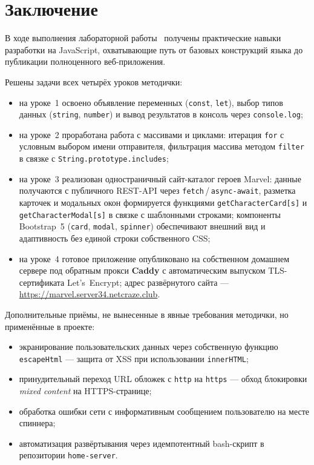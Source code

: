\chapter*{Заключение}
\label{ch:conclusion}

В ходе выполнения лабораторной работы~\cfgLabNumber{} получены
практические навыки разработки на JavaScript, охватывающие путь от
базовых конструкций языка до публикации полноценного веб-приложения.

Решены задачи всех четырёх уроков методички:

\begin{itemize}
  \item на уроке~1 освоено объявление переменных
        (\texttt{const}, \texttt{let}), выбор типов данных
        (\texttt{string}, \texttt{number}) и вывод результатов в
        консоль через \texttt{console.log};
  \item на уроке~2 проработана работа с массивами и циклами:
        итерация \texttt{for} с условным выбором имени отправителя,
        фильтрация массива методом \texttt{filter} в связке с
        \texttt{String.prototype.includes};
  \item на уроке~3 реализован одностраничный сайт-каталог героев
        Marvel: данные получаются с публичного REST-API через
        \texttt{fetch}\,/\,\texttt{async-await}, разметка карточек и
        модальных окон формируется функциями
        \texttt{getCharacterCard[s]} и \texttt{getCharacterModal[s]} в
        связке с шаблонными строками; компоненты Bootstrap~5
        (\texttt{card}, \texttt{modal}, \texttt{spinner}) обеспечивают
        внешний вид и адаптивность без единой строки собственного CSS;
  \item на уроке~4 готовое приложение опубликовано на собственном
        домашнем сервере под обратным прокси \textbf{Caddy} с
        автоматическим выпуском TLS-сертификата Let's~Encrypt; адрес
        развёрнутого сайта --- \url{https://marvel.server34.netcraze.club}.
\end{itemize}

Дополнительные приёмы, не вынесенные в явные требования методички, но
применённые в проекте:
\begin{itemize}
  \item экранирование пользовательских данных через собственную
        функцию \texttt{escapeHtml} --- защита от XSS при
        использовании \texttt{innerHTML};
  \item принудительный переход URL обложек с \texttt{http} на
        \texttt{https} --- обход блокировки \textit{mixed content} на
        HTTPS-странице;
  \item обработка ошибки сети с информативным сообщением
        пользователю на месте спиннера;
  \item автоматизация развёртывания через идемпотентный bash-скрипт
        в репозитории \texttt{home-server}.
\end{itemize}

